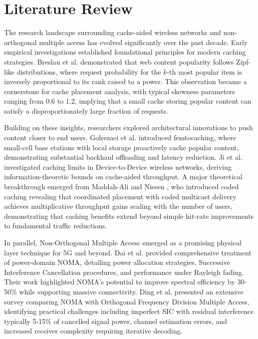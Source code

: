 \documentclass[12pt,a4paper]{article}
\begin{document}
\thispagestyle{plain}


\clearpage

\section{Literature Review}

The research landscape surrounding cache-aided wireless networks and non-orthogonal multiple access has evolved significantly over the past decade. Early empirical investigations established foundational principles for modern caching strategies. Breslau et al. \cite{breslau1999web} demonstrated that web content popularity follows Zipf-like distributions, where request probability for the $k$-th most popular item is inversely proportional to its rank raised to a power. This observation became a cornerstone for cache placement analysis, with typical skewness parameters ranging from 0.6 to 1.2, implying that a small cache storing popular content can satisfy a disproportionately large fraction of requests.

Building on these insights, researchers explored architectural innovations to push content closer to end users. Golrezaei et al. \cite{golrezaei2013femtocaching} introduced femtocaching, where small-cell base stations with local storage proactively cache popular content, demonstrating substantial backhaul offloading and latency reduction. Ji et al. \cite{ji2016d2d} investigated caching limits in Device-to-Device wireless networks, deriving information-theoretic bounds on cache-aided throughput. A major theoretical breakthrough emerged from Maddah-Ali and Niesen \cite{maddah2014fundamental}, who introduced coded caching revealing that coordinated placement with coded multicast delivery achieves multiplicative throughput gains scaling with the number of users, demonstrating that caching benefits extend beyond simple hit-rate improvements to fundamental traffic reductions.

In parallel, Non-Orthogonal Multiple Access emerged as a promising physical layer technique for 5G and beyond. Dai et al. \cite{dai2015noma} provided comprehensive treatment of power-domain NOMA, detailing power allocation strategies, Successive Interference Cancellation procedures, and performance under Rayleigh fading. Their work highlighted NOMA's potential to improve spectral efficiency by 30-50\% while supporting massive connectivity. Ding et al. \cite{ding2017survey} presented an extensive survey comparing NOMA with Orthogonal Frequency Division Multiple Access, identifying practical challenges including imperfect SIC with residual interference typically 5-15\% of cancelled signal power, channel estimation errors, and increased receiver complexity requiring iterative decoding.
\end{document}
